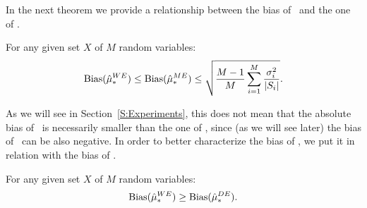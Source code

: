 In the next theorem we provide a relationship between the bias of \WE~and the one of \ME.
\begin{theorem}\label{T:BiasWEME}
 For any given set $X$ of $M$ random variables:
 $$\mathrm{Bias}(\hat\mu_*^{WE}) \leq \mathrm{Bias}(\hat\mu_*^{ME}) \leq \sqrt{\frac{M-1}{M}\sum_{i=1}^M \frac{\sigma_i^2}{|S_i|}}.$$
\end{theorem}
As we will see in Section~\ref{S:Experiments}, this does not mean that the absolute bias of \WE~is necessarily smaller than the one of \ME, since (as we will see later) the bias of \WE~can be also negative.
In order to better characterize the bias of \WE, we put it in relation with the bias of \CV.
\begin{theorem}\label{T:BiasWECV}
 For any given set $X$ of $M$ random variables:
  $$\mathrm{Bias}(\hat\mu_*^{WE}) \geq \mathrm{Bias}(\hat\mu_*^{DE}).$$
\end{theorem}

